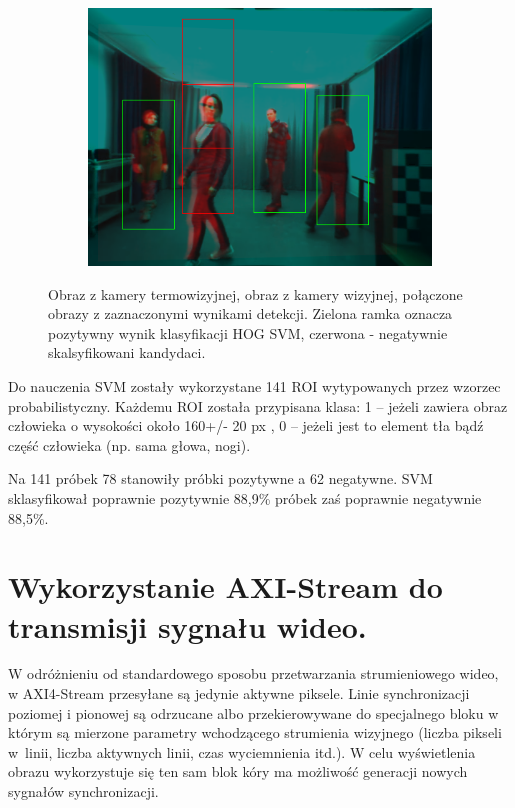 \begin{figure}[h]
\begin{subfigure}{0.32\textwidth}
		\subcaption{\label{fig:sampleRGB}}
	\end{subfigure}
	\begin{subfigure}{0.32\textwidth}
		\centering
		\includegraphics[width=0.9\linewidth]{images/sampleHOGSVM}
		\subcaption{\label{fig:sampleHOGSVM}}
	\end{subfigure}
	
	\caption[Detekcja]{\protect{} Obraz z kamery termowizyjnej, \protect{} obraz z kamery wizyjnej, \protect{} połączone obrazy z zaznaczonymi wynikami detekcji. Zielona ramka oznacza pozytywny wynik klasyfikacji HOG SVM, czerwona - negatywnie skalsyfikowani kandydaci.}
\end{figure}

Do nauczenia SVM zostały wykorzystane 141 ROI wytypowanych przez wzorzec probabilistyczny. Każdemu ROI została przypisana klasa: 1 – jeżeli zawiera obraz człowieka o wysokości około 160+/- 20 px , 0 – jeżeli jest to element tła bądź część człowieka (np. sama głowa, nogi). 

Na  141 próbek 78 stanowiły próbki pozytywne a 62 negatywne. SVM sklasyfikował poprawnie pozytywnie 88,9\% próbek zaś poprawnie negatywnie 88,5\%. 


\section{Wykorzystanie AXI-Stream do transmisji sygnału wideo.} 
W odróżnieniu od standardowego sposobu przetwarzania strumieniowego wideo, w AXI4-Stream przesyłane są jedynie aktywne piksele. 
Linie synchronizacji poziomej i pionowej są odrzucane albo przekierowywane do specjalnego bloku w którym są mierzone parametry wchodzącego strumienia wizyjnego (liczba pikseli w~linii, liczba aktywnych linii, czas wyciemnienia itd.). 
W celu wyświetlenia obrazu wykorzystuje się ten sam blok kóry ma możliwość generacji nowych sygnałów synchronizacji. 

